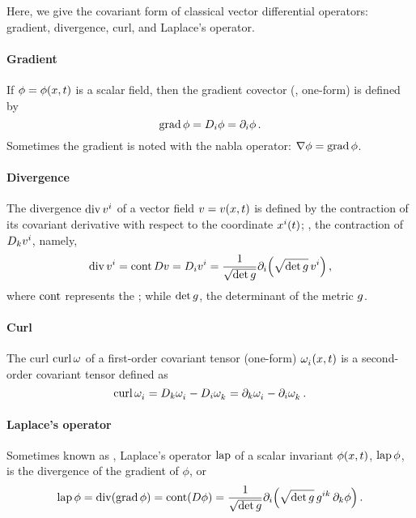 Here, we give the covariant form of classical vector differential operators: gradient, divergence, curl, and Laplace's operator.

\paragraph{Gradient} If $\phi = \phi\vat{\pos,t}$ is a scalar field, then the gradient covector (\aka, one-form) is defined by
%
\begin{equation*}
  \operatorname{grad}\phi = D_i\phi
            = \partial_{i}\phi\,.
\end{equation*}
%
Sometimes the gradient is noted with the nabla operator: $\nabla\phi = \operatorname{grad}\phi$.

\paragraph{Divergence} The divergence $\div\tvec vi$ of a vector field $v = v\vat{\pos,t}$ is defined by the contraction of its covariant derivative with respect to the coordinate $\tvec\pos i\vat t$; \ie, the contraction of $D_k\tvec vi$, namely,
%
\begin{equation*}
  \div\tvec vi  = \cont Dv
                = D_i\tvec vi
                = \dfrac{1}{\sqrt{\det\metric}}\ipd i\parens{\sqrt{\det\metric}\,\tvec vi}\,,
\end{equation*}
%
where $\operatorname{cont}$ represents the ; while $\det g$, the determinant of the metric $g$.

\paragraph{Curl} The curl $\operatorname{curl}\omega$ of a first-order covariant tensor (one-form) $\tcov\omega i\vat{\pos,t}$ is a second-order covariant tensor defined as
%
\begin{equation*}
  \curl\tcov\omega i  = D_k\tcov\omega i - D_i\tcov\omega k
                      = \ipd k\tcov\omega i - \ipd i\tcov\omega k\,.
\end{equation*}

\paragraph{Laplace's operator} Sometimes known as , Laplace's operator $\operatorname{lap}$ of a scalar invariant $\phi\vat{\pos,t}$, $\operatorname{lap}\phi$, is the divergence of the gradient of $\phi$, or
%
\begin{equation*}
  \lap\phi  = \div\parens{\grad\phi}
            = \cont\parens{D\phi}
            = \dfrac{1}{\sqrt{\det\metric}}\ipd i\parens{\sqrt{\det\metric}\,\tvecmet ik\,\ipd k\phi}\,.
\end{equation*}

